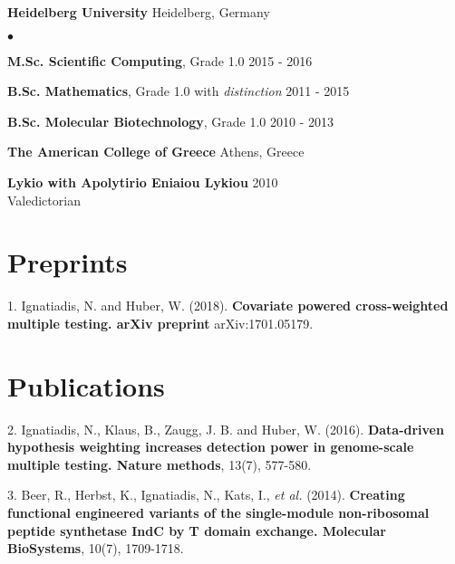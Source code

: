\documentclass[margin,line]{res}
\newcommand{\g}{\textgreek}
\newenvironment{list1}{
  \begin{list}{\ding{113}}{%
      \setlength{\itemsep}{0in}
      \setlength{\parsep}{0in} \setlength{\parskip}{0in}
      \setlength{\topsep}{0in} \setlength{\partopsep}{0in}
      \setlength{\leftmargin}{0.17in}}}{\end{list}}
\newenvironment{list2}{
  \begin{list}{$\bullet$}{%
      \setlength{\itemsep}{0in}
      \setlength{\parsep}{0in} \setlength{\parskip}{0in}
      \setlength{\topsep}{0in} \setlength{\partopsep}{0in}
      \setlength{\leftmargin}{0.2in}}}{\end{list}}
\begin{document}
\begin{resume}
\vspace*{-2.5mm}
{\bf {Heidelberg University}} \hfill  {Heidelberg, Germany}\\
\vspace*{-.14in}
\begin{list2}
\item \textbf{M.Sc. Scientific Computing}, Grade 1.0 \hfill 2015 - 2016
\item \textbf{B.Sc. Mathematics}, Grade 1.0 with \emph{distinction} \hfill 2011 - 2015
\item \textbf{B.Sc. Molecular Biotechnology}, Grade 1.0 \hfill 2010 - 2013
\end{list2}

\vspace*{-2.5mm}
{\bf {{The American College of Greece}}} \hfill  {Athens, Greece}\\
\vspace*{-.14in}
\begin{list1}
\item[]
\textbf{Lykio with Apolytirio Eniaiou Lykiou}  \hfill 2010\\
Valedictorian
\end{list1}


\section{\sc Preprints}
\begin{list1}

\item[1.]Ignatiadis, N. and Huber, W. (2018). \textbf{Covariate powered cross-weighted multiple testing. arXiv preprint} arXiv:1701.05179.

\end{list1}


\section{\sc Publications}
\begin{list1}
\item[2.]  Ignatiadis, N., Klaus, B., Zaugg, J. B. and Huber, W. (2016). \textbf{Data-driven hypothesis weighting increases detection power in genome-scale multiple testing. Nature methods}, 13(7), 577-580.
\item[3.] Beer, R., Herbst, K., Ignatiadis, N., Kats, I., \emph{et al.} (2014). \textbf{Creating functional engineered variants of the single-module non-ribosomal peptide synthetase IndC by T domain exchange. Molecular BioSystems}, 10(7), 1709-1718.
\end{list1}


\end{resume}
\end{document}
